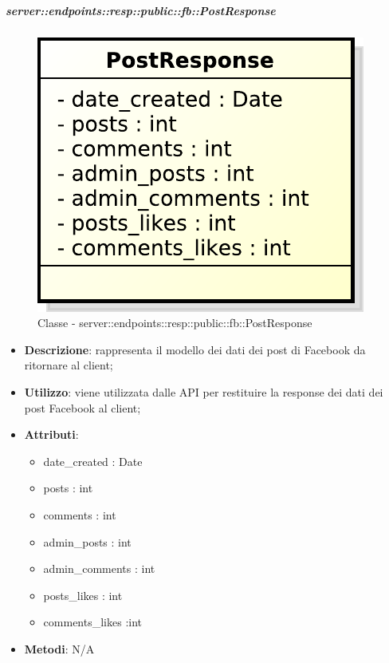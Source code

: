    \subparagraph{server::endpoints::resp::public::fb::PostResponse} %
    \label{subp:bdsm_app_server_endpoints_resp_public_fb_postresponse}
	\begin{figure}[!htbp]
		\centering
		\centerline{\includegraphics[scale=0.6]{./images/server/classes/endpoints/fb/post_response.pdf}}
		\caption{Classe - server::endpoints::resp::public::fb::PostResponse}
	\end{figure}
    \begin{itemize}
      \item \textbf{Descrizione}: rappresenta il modello dei dati dei post di Facebook da ritornare al client;
      \item \textbf{Utilizzo}: viene utilizzata dalle API per restituire la response dei dati dei post Facebook al client;

	  \item \textbf{Attributi}:
	  	\begin{itemize}
	  		\item date\_created : Date
	  		\item posts : int
	  		\item comments : int
	  		\item admin\_posts : int
	  		\item admin\_comments : int
	  		\item posts\_likes : int
	  		\item comments\_likes :int
	  	\end{itemize}
	  \item \textbf{Metodi}: N/A
    \end{itemize}

